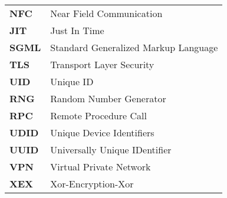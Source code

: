 \begin{table*}[htbp]
\begin{tabular}{p{3cm}p{12cm}}
		     \textbf{NFC} & Near Field Communication \\
             
             \textbf{JIT} & Just In Time \\		     
		     
		     \textbf{SGML} & Standard Generalized Markup Language \\
 		     
 		     \textbf{TLS} & Transport Layer Security \\
 		     
 		     \textbf{UID} & Unique ID \\
 		     
 		     \textbf{RNG} & Random Number Generator\\
 		     \textbf{RPC} & Remote Procedure Call \\
 		     
 		     \textbf{UDID} & Unique Device Identifiers\\
 		     \textbf{UUID} &  Universally Unique IDentifier \\
 		 	 
 		 	 \textbf{VPN} & Virtual Private Network \\
	         \textbf{XEX} &  Xor-Encryption-Xor \\  
		\end{tabular}
\end{table*}